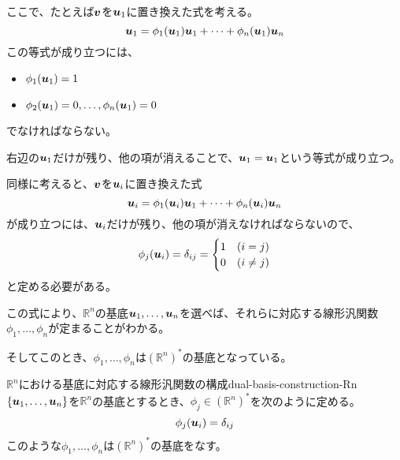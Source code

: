 \documentclass[../../../topic_linear-algebra]{subfiles}
\begin{document}
\br

ここで、たとえば$\vb*{v}$を$\vb*{u}_1$に置き換えた式を考える。
\begin{equation*}
  \vb*{u}_1 = \phi_1(\vb*{u}_1) \vb*{u}_1 + \cdots + \phi_n(\vb*{u}_1) \vb*{u}_n
\end{equation*}
この等式が成り立つには、
\begin{itemize}
  \item $\phi_1(\vb*{u}_1) = 1$
  \item $\phi_2(\vb*{u}_1) = 0, \ldots, \phi_n(\vb*{u}_1) = 0$
\end{itemize}
でなければならない。

右辺の$\vb*{u}_1$だけが残り、他の項が消えることで、$\vb*{u}_1 = \vb*{u}_1$という等式が成り立つ。

\br

同様に考えると、$\vb*{v}$を$\vb*{u}_i$に置き換えた式
\begin{equation*}
  \vb*{u}_i = \phi_1(\vb*{u}_i) \vb*{u}_1 + \cdots + \phi_n(\vb*{u}_i) \vb*{u}_n
\end{equation*}
が成り立つには、$\vb*{u}_i$だけが残り、他の項が消えなければならないので、
\begin{equation*}
  \phi_j (\vb*{u}_i) = \delta_{ij} = \begin{cases}
    1 & (i = j) \\
    0 & (i \neq j)
  \end{cases}
\end{equation*}
と定める必要がある。

\br

この式により、$\mathbb{R}^n$の基底$\vb*{u}_1, \ldots, \vb*{u}_n$を選べば、それらに対応する線形汎関数$\phi_1, \ldots, \phi_n$が定まることがわかる。

そしてこのとき、$\phi_1, \ldots, \phi_n$は$(\mathbb{R}^n)^*$の基底となっている。

\begin{theorem}{$\mathbb{R}^n$における基底に対応する線形汎関数の構成}{dual-basis-construction-Rn}
  $\{ \vb*{u}_1, \ldots, \vb*{u}_n \}$を$\mathbb{R}^n$の基底とするとき、$\phi_j \in (\mathbb{R}^n)^*$を次のように定める。
  \begin{equation*}
    \phi_j (\vb*{u}_i) = \delta_{ij}
  \end{equation*}
  このような$\phi_1, \ldots, \phi_n$は$(\mathbb{R}^n)^*$の基底をなす。
\end{theorem}
\end{document}
